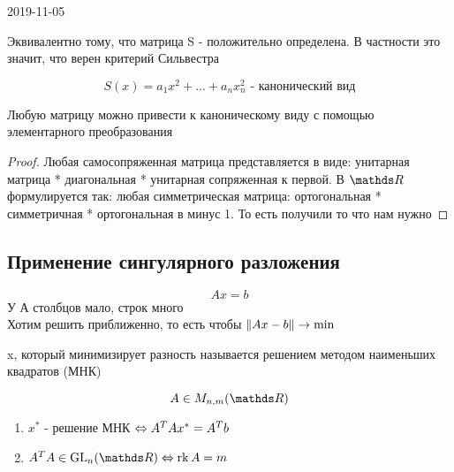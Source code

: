 \documentclass[main]{subfiles}
\begin{document}
\begin{lect}{2019-11-05}
    \begin{remark}
      Эквивалентно тому, что матрица S - положительно определена. В частности это значит, что верен критерий Сильвестра
    \end{remark}

    \begin{Definition}
      \[S(x) = a_1 x^2 + ... + a_n x_n^2 \text{ - канонический вид}\]
    \end{Definition}

    \begin{theorem}
      Любую матрицу можно привести к каноническому виду с помощью элементарного преобразования
    \end{theorem}

    \begin{proof}
      Любая самосопряженная матрица представляется в виде: унитарная матрица * диагональная * унитарная сопряженная к первой. В $\R$ формулируется так: любая симметрическая матрица: ортогональная * симметричная * ортогональная в минус 1. То есть получили то что нам нужно
    \end{proof}

    \subsection{Применение сингулярного разложения}
    \[Ax = b\]
    У А столбцов мало, строк много\\
    Хотим решить приближенно, то есть чтобы $\lVert Ax-b \rVert \rightarrow \min$

    \begin{definition}
      x, который минимизирует разность называется решением методом наименьших квадратов (МНК)
    \end{definition}

    \begin{Theorem}
      \[A \in M_{n,m}(\R)\]
      \begin{enumerate}
        \item $x^*$ - решение МНК $\Leftrightarrow A^T A x^* = A^T b$
        \item $A^T A \in \GL_n(\R) \lra \rk A = m$
      \end{enumerate}
    \end{Theorem}


\end{lect}
\end{document}

